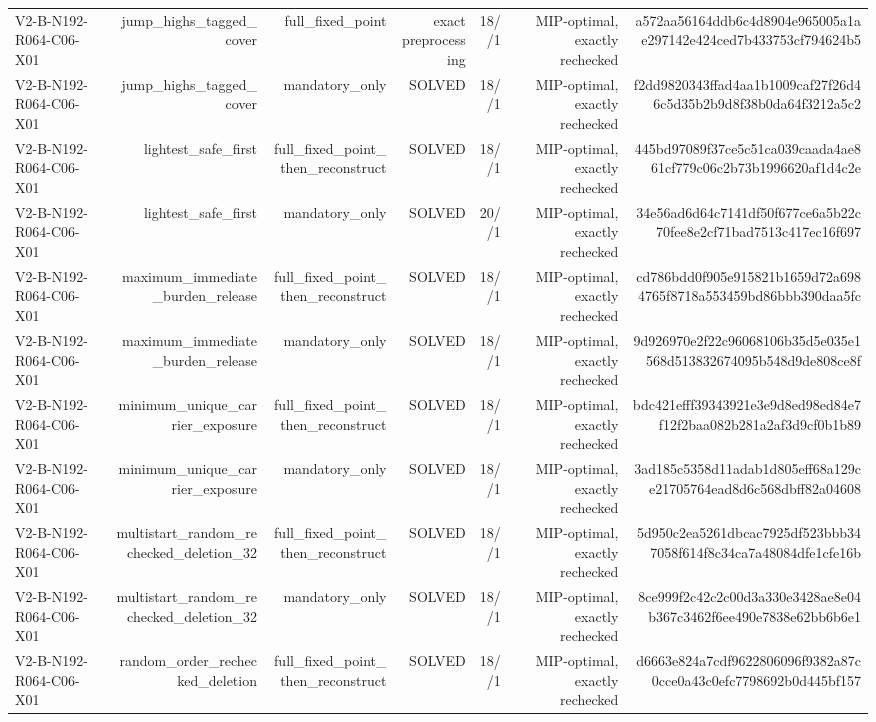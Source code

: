 {\begin{longtable}{lrrrrrr}
V2-B-N192-R064-C06-X01 & jump\_highs\_tagged\_cover & full\_fixed\_point & exact preprocessing & 18//1 & MIP-optimal, exactly rechecked & a572aa56164ddb6c4d8904e965005a1ae297142e424ced7b433753cf794624b5 \\
V2-B-N192-R064-C06-X01 & jump\_highs\_tagged\_cover & mandatory\_only & SOLVED & 18//1 & MIP-optimal, exactly rechecked & f2dd9820343ffad4aa1b1009caf27f26d46c5d35b2b9d8f38b0da64f3212a5c2 \\
V2-B-N192-R064-C06-X01 & lightest\_safe\_first & full\_fixed\_point\_then\_reconstruct & SOLVED & 18//1 & MIP-optimal, exactly rechecked & 445bd97089f37ce5c51ca039caada4ae861cf779c06c2b73b1996620af1d4c2e \\
V2-B-N192-R064-C06-X01 & lightest\_safe\_first & mandatory\_only & SOLVED & 20//1 & MIP-optimal, exactly rechecked & 34e56ad6d64c7141df50f677ce6a5b22c70fee8e2cf71bad7513c417ec16f697 \\
V2-B-N192-R064-C06-X01 & maximum\_immediate\_burden\_release & full\_fixed\_point\_then\_reconstruct & SOLVED & 18//1 & MIP-optimal, exactly rechecked & cd786bdd0f905e915821b1659d72a6984765f8718a553459bd86bbb390daa5fc \\
V2-B-N192-R064-C06-X01 & maximum\_immediate\_burden\_release & mandatory\_only & SOLVED & 18//1 & MIP-optimal, exactly rechecked & 9d926970e2f22c96068106b35d5e035e1568d513832674095b548d9de808ce8f \\
V2-B-N192-R064-C06-X01 & minimum\_unique\_carrier\_exposure & full\_fixed\_point\_then\_reconstruct & SOLVED & 18//1 & MIP-optimal, exactly rechecked & bdc421efff39343921e3e9d8ed98ed84e7f12f2baa082b281a2af3d9cf0b1b89 \\
V2-B-N192-R064-C06-X01 & minimum\_unique\_carrier\_exposure & mandatory\_only & SOLVED & 18//1 & MIP-optimal, exactly rechecked & 3ad185c5358d11adab1d805eff68a129ce21705764ead8d6c568dbff82a04608 \\
V2-B-N192-R064-C06-X01 & multistart\_random\_rechecked\_deletion\_32 & full\_fixed\_point\_then\_reconstruct & SOLVED & 18//1 & MIP-optimal, exactly rechecked & 5d950c2ea5261dbcac7925df523bbb347058f614f8c34ca7a48084dfe1cfe16b \\
V2-B-N192-R064-C06-X01 & multistart\_random\_rechecked\_deletion\_32 & mandatory\_only & SOLVED & 18//1 & MIP-optimal, exactly rechecked & 8ce999f2c42c2c00d3a330e3428ae8e04b367c3462f6ee490e7838e62bb6b6e1 \\
V2-B-N192-R064-C06-X01 & random\_order\_rechecked\_deletion & full\_fixed\_point\_then\_reconstruct & SOLVED & 18//1 & MIP-optimal, exactly rechecked & d6663e824a7cdf9622806096f9382a87c0cce0a43c0efc7798692b0d445bf157 \\

\end{longtable}}
